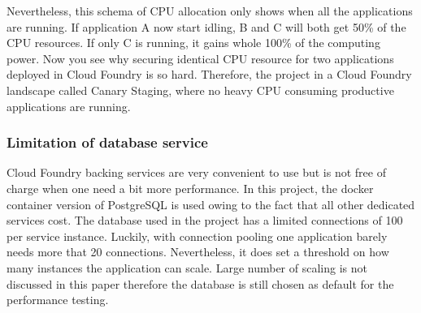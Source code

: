 Nevertheless, this schema of CPU allocation only shows when all the applications are running. If application A now start idling, B and C will both get 50\% of the CPU resources. If only C is running, it gains whole 100\% of the computing power. Now you see why securing identical CPU resource for two applications deployed in Cloud Foundry is so hard. Therefore, the project in a Cloud Foundry landscape called Canary Staging, where no heavy CPU consuming productive applications are running. \\
\subsubsection{Limitation of database service}
Cloud Foundry backing services are very convenient to use but is not free of charge when one need a bit more performance. In this project, the docker container version of PostgreSQL is used owing to the fact that all other dedicated services cost. The database used in the project has a limited connections of 100 per service instance. Luckily,  with connection pooling one application barely needs more that 20 connections. Nevertheless, it does set a threshold on how many instances the application can scale. Large number of scaling is not discussed in this paper therefore the database is still chosen as default for the performance testing. \\

